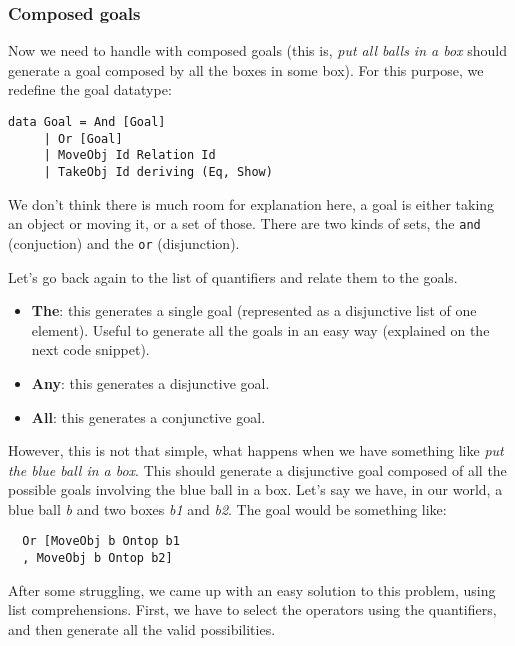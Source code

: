 \documentclass[11pt]{article}
\begin{document}
          \subsubsection{Composed goals}
          Now we need to handle with composed goals (this is, \textit{put all balls
          in a box} should generate a goal composed by all the boxes in some box). For 
          this purpose, we redefine the goal datatype:

\begin{verbatim}
data Goal = And [Goal]
     | Or [Goal]
     | MoveObj Id Relation Id
     | TakeObj Id deriving (Eq, Show)
\end{verbatim}

          We don't think there is much room for explanation here, a goal is either 
          taking an object or moving it, or a set of those. There are two kinds of 
          sets, the \texttt{and} (conjuction) and the \texttt{or} (disjunction).

          Let's go back again to the list of quantifiers and relate them to the goals.

          \begin{itemize}
            \item {\bf The}: this generates a single goal (represented as a disjunctive
            list of one element). Useful to generate all the goals in an easy way
            (explained on the next code snippet).
            \item {\bf Any}: this generates a disjunctive goal.
            \item {\bf All}: this generates a conjunctive goal.
          \end{itemize}

          However, this is not that simple, what happens when we have something like 
          \textit{put the blue ball in a box}. This should generate a disjunctive goal
          composed of all the possible goals involving the blue ball in a box. Let's say
          we have, in our world, a blue ball \textit{b} and two boxes \textit{b1} and \textit{b2}. The goal would be something like:

\begin{verbatim}
  Or [MoveObj b Ontop b1
  , MoveObj b Ontop b2]
\end{verbatim}

          After some struggling, we came up with an easy solution to this problem, using list comprehensions.
          First, we have to select the operators using the quantifiers, and then generate all the valid possibilities.
\end{document}
